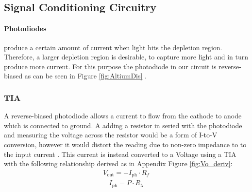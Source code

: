 \subsection{Signal Conditioning Circuitry} %
\label{subsec:SignalConditioningCircuitry}

\paragraph{Photodiodes} produce a certain amount of current when light hits the depletion region. Therefore, a larger depletion region is desirable, to capture more light and in turn produce more current. For this purpose the photodiode in our circuit is reverse-biased as can be seen in Figure \ref{fig:AltiumDis} \cite[p.155]{RefWorks:keiser2021fiber}. 

%
\subsubsection{\acf{TIA}}
A reverse-biased photodiode allows a current to flow from the cathode to anode which is connected to ground. A adding a resistor in seried with the photodiode and measuring the voltage across the resistor would be a form of I-to-V conversion, however it would distort the reading due to non-zero impedance to to the input current \cite[p.233]{RefWorks:horowitz2015theart}. This current is instead converted to a Voltage using a \ac{TIA} with the following relationship derived as in Appendix Figure \ref{fig:Vo_deriv}:
\begin{equation} \label{eq:TIAoutput} %
  \begin{split}
  V_{\text{out}} = - I_{\text{ph}} \cdot R_f
  \end{split}
\end{equation}
\begin{equation} \label{eq:Photocurrent} %
  \begin{split}
  I_{\text{ph}} = P \cdot R_{\lambda}
  \end{split}
\end{equation}

